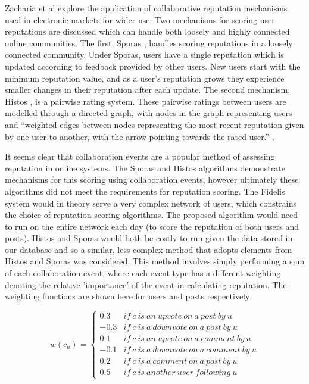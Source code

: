 Zacharia et al explore the application of collaborative reputation mechanisms used in electronic markets for wider use. Two mechanisms for scoring user reputations are discussed which can handle both loosely and highly connected online communities. The first, Sporas \cite{zacharia2000}, handles scoring reputations in a loosely connected community. Under Sporas, users have a single reputation which is updated according to feedback provided by other users. New users start with the minimum reputation value, and as a user’s reputation grows they experience smaller changes in their reputation after each update. The second mechanism, Histos \cite{zacharia2000}, is a pairwise rating system. These pairwise ratings between users are modelled through a directed graph, with nodes in the graph representing users and ``weighted edges between nodes representing the most recent reputation given by one user to another, with the arrow pointing towards the rated user.'' \cite{zacharia2000}.

It seems clear that collaboration events are a popular method of assessing reputation in online systems. The Sporas and Histos algorithms demonstrate mechanisms for this scoring using collaboration events, however ultimately these algorithms did not meet the requirements for reputation scoring. The Fidelis system would in theory serve a very complex network of users, which constrains the choice of reputation scoring algorithms. The proposed algorithm would need to run on the entire network each day (to score the reputation of both users and posts). Histos and Sporas would both be costly to run given the data stored in our database and so a similar, less complex method that adopts elements from Histos and Sporas was considered. This method involves simply performing a sum of each collaboration event, where each event type has a different weighting denoting the relative 'importance' of the event in calculating reputation. The weighting functions are shown here for users and posts respectively

\begin{equation}
	\label{eq:rep_weight_user}
		w(c_u) = \left\{\begin{matrix}
			0.3 & if\ c\ is\ an\ upvote\ on\ a\ post\ by\ u\\ 
			-0.3 & if\ c\ is\ a\ downvote\ on\ a\ post\ by\ u \\ 
			0.1 & if\ c\ is\ an\ upvote\ on\ a\ comment\ by\ u \\ 
			-0.1 & if\ c\ is\ a\ downvote\ on\ a\ comment\ by\ u \\ 
			0.2 & if\ c\ is\ a\ comment\ on\ a\ post\ by\ u\\ 
			0.5 & if\ c\ is\ another\ user\ following\ u
		\end{matrix}\right.
\end{equation}
		
